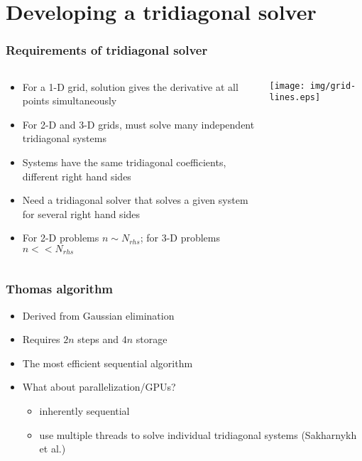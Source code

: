 \section{Developing a tridiagonal solver}

\begin{frame}
\frametitle{Requirements of tridiagonal solver}
\begin{columns}
\begin{column}{0.5\textwidth}
\begin{itemize}
\item For a 1-D grid, solution gives the derivative
    at all points simultaneously
\item For 2-D and 3-D grids,
    must solve many independent tridiagonal systems
\item Systems have the same tridiagonal coefficients,
    different right hand sides
\item Need a tridiagonal solver that solves
    a given system for several right hand sides
\item For 2-D problems $n \sim N_{rhs}$;
    for 3-D problems $n << N_{rhs}$
\end{itemize}
\end{column}
\begin{column}{0.5\textwidth}
    \hspace{1cm}
    \texttt{[image: img/grid-lines.eps]}
\end{column}
\end{columns}
\end{frame}

\begin{frame}
\frametitle{Thomas algorithm}
\begin{itemize}
\item Derived from Gaussian elimination
\item Requires $2n$ steps and $4n$ storage
\item The most efficient sequential algorithm
\item What about parallelization/GPUs?
    \begin{itemize}
        \item inherently sequential
        \item use multiple threads to solve
            individual tridiagonal systems
            (Sakharnykh et al.)
    \end{itemize}
\end{itemize}
\end{frame}

